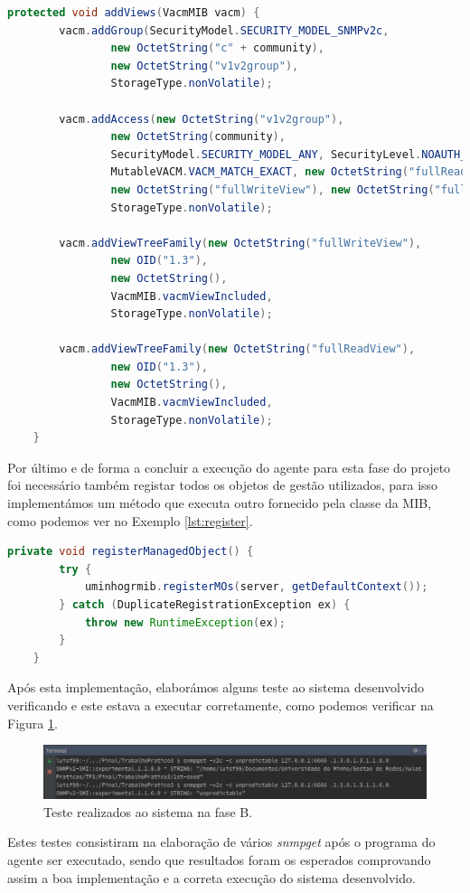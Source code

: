 \documentclass[../momento_1.tex]{subfiles}
\begin{document}
{
\begin{lstlisting}[caption={Método utilizado para adição da configuração VACM.},label={lst:views},language=JAVA]
	protected void addViews(VacmMIB vacm) {
        vacm.addGroup(SecurityModel.SECURITY_MODEL_SNMPv2c,
                new OctetString("c" + community),
                new OctetString("v1v2group"),
                StorageType.nonVolatile);

        vacm.addAccess(new OctetString("v1v2group"),
                new OctetString(community),
                SecurityModel.SECURITY_MODEL_ANY, SecurityLevel.NOAUTH_NOPRIV,
                MutableVACM.VACM_MATCH_EXACT, new OctetString("fullReadView"),
                new OctetString("fullWriteView"), new OctetString("fullNotifyView"),
                StorageType.nonVolatile);

        vacm.addViewTreeFamily(new OctetString("fullWriteView"),
                new OID("1.3"),
                new OctetString(),
                VacmMIB.vacmViewIncluded,
                StorageType.nonVolatile);

        vacm.addViewTreeFamily(new OctetString("fullReadView"),
                new OID("1.3"),
                new OctetString(),
                VacmMIB.vacmViewIncluded,
                StorageType.nonVolatile);
    }
\end{lstlisting}}

Por último e de forma a concluir a execução do agente para esta fase do projeto foi necessário também registar todos os objetos de gestão utilizados, para isso implementámos um método que executa  outro fornecido pela classe da MIB, como podemos ver no Exemplo \ref{lst:register}.\\[0.5cm]

{
\begin{lstlisting}[caption={Método utilizado para registar os objetos de gestão.},label={lst:register},language=JAVA]
	private void registerManagedObject() {
        try {
            uminhogrmib.registerMOs(server, getDefaultContext());
        } catch (DuplicateRegistrationException ex) {
            throw new RuntimeException(ex);
        }
    }
\end{lstlisting}}

Após esta implementação, elaborámos alguns teste ao sistema desenvolvido verificando e este estava a  executar corretamente, como podemos verificar na Figura \ref{fig:faseB}.\\ 

\begin{figure}[H]
\centering
\captionsetup{justification=centering,margin=2cm}
\centerline{\includegraphics[scale=0.4]{../imagens/faseB.png}}
\caption{Teste realizados ao sistema na fase B.}
\label{fig:faseB}
\end{figure}

Estes testes consistiram na elaboração de vários \textit{snmpget} após o programa do agente ser executado, sendo que resultados foram os esperados comprovando assim a boa implementação e a correta execução do sistema desenvolvido.\\[13cm] 
\end{document}
